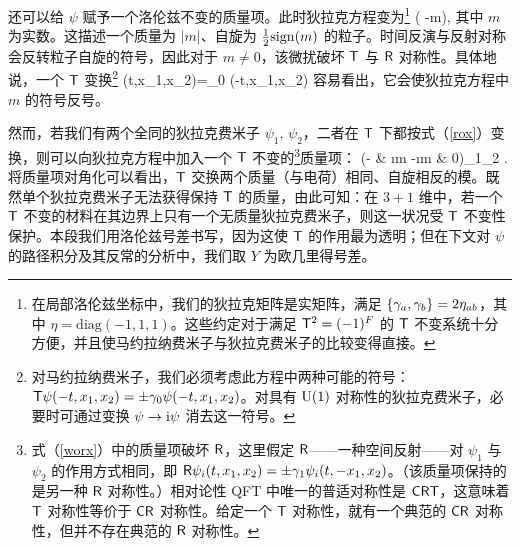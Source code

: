 还可以给 $\psi$ 赋予一个洛伦兹不变的质量项。此时狄拉克方程变为\footnote{在局部洛伦兹坐标中，我们的狄拉克矩阵是实矩阵，满足 $\{{\gamma}_a,{\gamma}_b\}=2\eta_{ab}$，其中 $\eta=\mathrm{diag}(-1,1,1)$。这些约定对于满足 ${\sf T}^2=(-1)^F$ 的 ${\sf T}$ 不变系统十分方便，并且使马约拉纳费米子与狄拉克费米子的比较变得直接。}
\be\label{orx}\left( -m\right),\ee
其中 $m$ 为实数。这描述一个质量为 $|m|$、自旋为 $\frac{1}{2}{\mathrm{sign}}(m)$ 的粒子。时间反演与反射对称会反转粒子自旋的符号，因此对于 $m\not=0$，该微扰破坏 ${\sf T}$ 与 ${\sf R}$ 对称性。具体地说，一个 ${\sf T}$ 变换\footnote{对马约拉纳费米子，我们必须考虑此方程中两种可能的符号：${\sf T}\psi(-t,x_1,x_2)=\pm{\gamma}_0\psi(-t,x_1,x_2)$。对具有 ${\mathrm U}(1)$ 对称性的狄拉克费米子，必要时可通过变换 $\psi\to{\mathrm i}\psi$ 消去这一符号。}
\be\label{rox}\sT\psi(t,x_1,x_2)=\g_0 \psi(-t,x_1,x_2) \ee
容易看出，它会使狄拉克方程中 $m$ 的符号反号。

然而，若我们有两个全同的狄拉克费米子 $\psi_1,\,\psi_2$，二者在 ${\sf T}$ 下都按式（\ref{rox}）变换，则可以向狄拉克方程中加入一个 ${\sf T}$ 不变的\footnote{式（\ref{worx}）中的质量项破坏 ${\sf R}$，这里假定 ${\sf R}$——一种空间反射——对 $\psi_1$ 与 $\psi_2$ 的作用方式相同，即 ${\sf R}\psi_i(t,x_1,x_2)=\pm {\gamma}_1\psi_i(t,-x_1,x_2)$。（该质量项保持的是另一种 ${\sf R}$ 对称性。）相对论性 QFT 中唯一的普适对称性是 ${\sf{CRT}}$，这意味着 ${\sf T}$ 对称性等价于 ${\sf{CR}}$ 对称性。给定一个 ${\sf T}$ 对称性，就有一个典范的 ${\sf{CR}}$ 对称性，但并不存在典范的 ${\sf R}$ 对称性。}质量项：
\be\label{worx}\left(- & \i m \cr -\i m & 0\ep\right)\bp \psi_1\cr \psi_2 . \ee
将质量项对角化可以看出，${\sf T}$ 交换两个质量（与电荷）相同、自旋相反的模。既然单个狄拉克费米子无法获得保持 ${\sf T}$ 的质量，由此可知：在 $3+1$ 维中，若一个 ${\sf T}$ 不变的材料在其边界上只有一个无质量狄拉克费米子，则这一状况受 ${\sf T}$ 不变性保护。本段我们用洛伦兹号差书写，因为这使 ${\sf T}$ 的作用最为透明；但在下文对 $\psi$ 的路径积分及其反常的分析中，我们取 $Y$ 为欧几里得号差。

